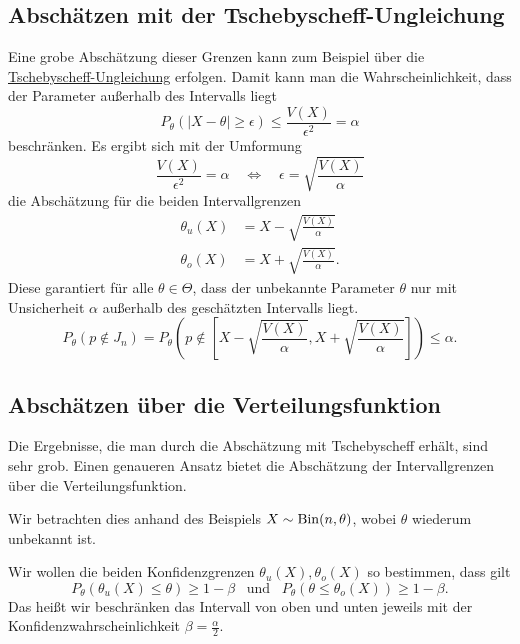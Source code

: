 \subsection{Abschätzen mit der Tschebyscheff-Ungleichung}
Eine grobe Abschätzung dieser Grenzen kann zum Beispiel über die \hyperref[tschebyscheff]{Tschebyscheff-Ungleichung} erfolgen.
Damit kann man die Wahrscheinlichkeit, dass der Parameter außerhalb des Intervalls liegt
\begin{equation*}
	P_\theta(|X-\theta|\geq \epsilon)\leq \frac{V(X)}{\epsilon^2}= \alpha
\end{equation*}
beschränken.
Es ergibt sich mit der Umformung 
\begin{equation*}
	\frac{V(X)}{\epsilon^2}= \alpha \quad \Leftrightarrow \quad \epsilon =\sqrt{\frac{V(X)}{\alpha}}
\end{equation*}
die Abschätzung für die beiden Intervallgrenzen
\begin{align*}
	\theta_u(X)&=X-\sqrt{\frac{V(X)}{\alpha}}\\
	\theta_o(X)&=X+\sqrt{\frac{V(X)}{\alpha}}.
\end{align*}
Diese garantiert für alle $\theta\in\Theta$, dass der unbekannte Parameter $\theta$ nur mit Unsicherheit $\alpha$ außerhalb des geschätzten Intervalls liegt.
\begin{equation*}
	P_\theta(p\not\in J_n)=\textstyle P_\theta\left(p\not\in \left[ X-\sqrt{\frac{V(X)}{\alpha}},X+\sqrt{\frac{V(X)}{\alpha}}\right]\right)\leq \alpha.
\end{equation*}


\subsection{Abschätzen über die Verteilungsfunktion}
Die Ergebnisse, die man durch die Abschätzung mit Tschebyscheff erhält, sind sehr grob. Einen genaueren Ansatz bietet die Abschätzung der Intervallgrenzen über die Verteilungsfunktion.

Wir betrachten dies anhand des Beispiels $X\sim\operatorname{Bin}(n,\theta)$, wobei $\theta$ wiederum unbekannt ist.

Wir wollen die beiden Konfidenzgrenzen $\theta_u(X),\theta_o(X)$ so bestimmen, dass gilt
\begin{equation*}
	P_\theta(\theta_u(X) \leq \theta )\geq 1-\beta \enspace\text{ und }\enspace P_\theta(\theta \leq \theta_o(X) )\geq 1-\beta.
\end{equation*}
Das heißt wir beschränken das Intervall von oben und unten jeweils mit der Konfidenzwahrscheinlichkeit $\beta=\frac\alpha2$.

